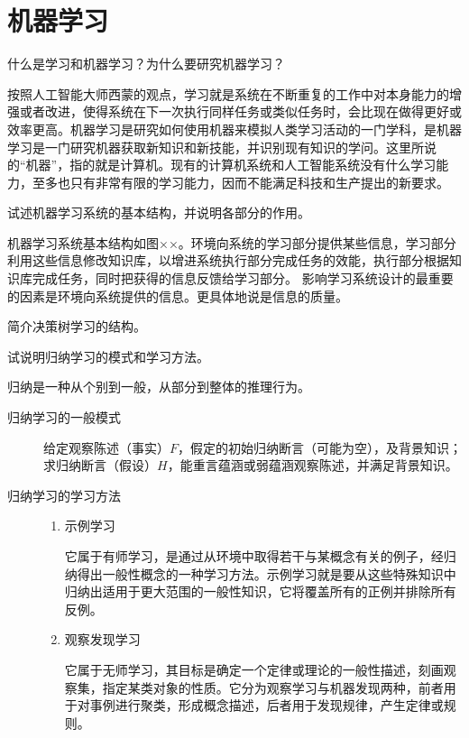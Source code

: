 \chapter{机器学习}

\begin{question}
什么是学习和机器学习？为什么要研究机器学习？
\end{question}
\begin{solution}
按照人工智能大师西蒙的观点，学习就是系统在不断重复的工作中对本身能力的增强或者改进，使得系统在下一次执行同样任务或类似任务时，会比现在做得更好或效率更高。机器学习是研究如何使用机器来模拟人类学习活动的一门学科，是机器学习是一门研究机器获取新知识和新技能，并识别现有知识的学问。这里所说的“机器”，指的就是计算机。现有的计算机系统和人工智能系统没有什么学习能力，至多也只有非常有限的学习能力，因而不能满足科技和生产提出的新要求。 
\end{solution}

\begin{question}
试述机器学习系统的基本结构，并说明各部分的作用。
\end{question}
\begin{solution}
机器学习系统基本结构如图××。环境向系统的学习部分提供某些信息，学习部分利用这些信息修改知识库，以增进系统执行部分完成任务的效能，执行部分根据知识库完成任务，同时把获得的信息反馈给学习部分。 影响学习系统设计的最重要的因素是环境向系统提供的信息。更具体地说是信息的质量。 
\end{solution}

\begin{question}
简介决策树学习的结构。
\end{question}
\begin{solution}
\end{solution}

\begin{question}
试说明归纳学习的模式和学习方法。
\end{question}
\begin{solution}
归纳是一种从个别到一般，从部分到整体的推理行为。
	\begin{description}
		\item[归纳学习的一般模式] 给定观察陈述（事实）$F$，假定的初始归纳断言（可能为空），及背景知识；求归纳断言（假设）$H$，能重言蕴涵或弱蕴涵观察陈述，并满足背景知识。 
		\item[归纳学习的学习方法] \quad
			\begin{enumerate}
				\item 示例学习 \par
				它属于有师学习，是通过从环境中取得若干与某概念有关的例子，经归纳得出一般性概念的一种学习方法。示例学习就是要从这些特殊知识中归纳出适用于更大范围的一般性知识，它将覆盖所有的正例并排除所有反例。
				\item 观察发现学习 \par
				它属于无师学习，其目标是确定一个定律或理论的一般性描述，刻画观察集，指定某类对象的性质。它分为观察学习与机器发现两种，前者用于对事例进行聚类，形成概念描述，后者用于发现规律，产生定律或规则。 
			\end{enumerate}
	\end{description}
\end{solution}

